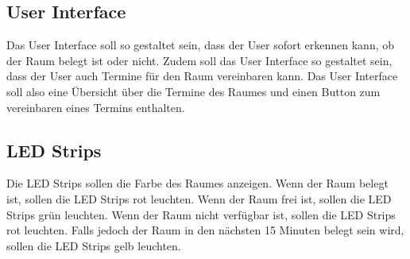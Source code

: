 \subsection{User Interface}
Das User Interface soll so gestaltet sein, dass der User sofort erkennen kann, ob der Raum belegt ist oder nicht. Zudem soll das User Interface so gestaltet sein, dass der User auch Termine für den Raum vereinbaren kann. Das User Interface soll also eine Übersicht über die Termine des Raumes und einen Button zum vereinbaren eines Termins enthalten.
\subsection{LED Strips}
Die LED Strips sollen die Farbe des Raumes anzeigen. Wenn der Raum belegt ist, sollen die LED Strips rot leuchten. Wenn der Raum frei ist, sollen die LED Strips grün leuchten. Wenn der Raum nicht verfügbar ist, sollen die LED Strips rot leuchten. Falls jedoch der Raum in den nächsten 15 Minuten belegt sein wird, sollen die LED Strips gelb leuchten.


